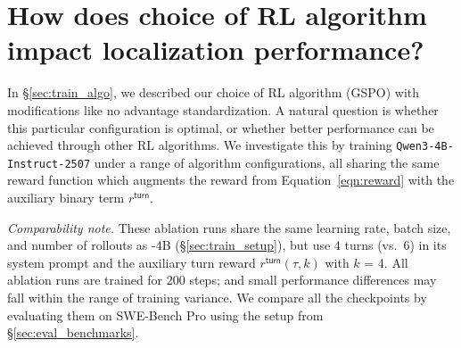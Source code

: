 \section{How does choice of RL algorithm impact localization performance?}\label{appendix:rl_ablation_study}

In \S\ref{sec:train_algo}, we described our choice of RL algorithm (GSPO) with modifications like no advantage standardization. A natural question is whether this particular configuration is optimal, or whether better performance can be achieved through other RL algorithms. We investigate this by training \texttt{Qwen3-4B-Instruct-2507} under a range of algorithm configurations, all sharing the same reward function which augments the reward from Equation~\ref{eqn:reward} with the auxiliary binary term $r^{\mathsf{turn}}$.

\emph{Comparability note.} These ablation runs share the same learning rate, batch size, and number of rollouts as \methodname-4B (\S\ref{sec:train_setup}), but use 4 turns (vs.\ 6) in its system prompt and the auxiliary turn reward $r^{\mathsf{turn}}(\tau, k)$ with $k$ = 4. All ablation runs are trained for 200 steps; and small performance differences may fall within the range of training variance. We compare all the checkpoints by evaluating them on SWE-Bench Pro using the setup from \S\ref{sec:eval_benchmarks}.

